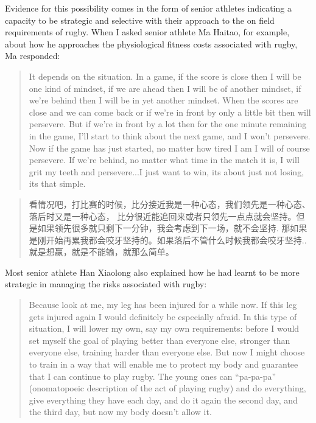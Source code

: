 \begin{CJK}{UTF8}{gbsn}
Evidence for this possibility comes in the form of senior athletes indicating a capacity to be strategic and selective with their approach to the on field requirements of rugby.  When I asked senior athlete Ma Haitao, for example, about how he approaches the physiological fitness costs associated with rugby, Ma responded:

    \begin{quotation}
      It depends on the situation.  In a game, if the score is close then I will be one kind of mindset, if we are ahead then I will be of another mindset, if we're behind then I will be in yet another mindset.  When the scores are close and we can come back or if we're in front by only a little bit then will persevere.  But if we're in front by a lot then for the one minute remaining in the game, I'll start to think about the next game, and I won't persevere.  Now if the game has just started, no matter how tired I am I will of course persevere. If we're behind, no matter what time in the match it is, I will grit my teeth and persevere...I just want to win, its about just not losing, its that simple.
    \end{quotation}

    \begin{quotation}
      看情况吧，打比赛的时候，比分接近我是一种心态，我们领先是一种心态、落后时又是一种心态， 比分很近能追回来或者只领先一点点就会坚持。但是如果领先很多就只剩下一分钟，我会考虑到下一场，就不会坚持.  那如果是刚开始再累我都会咬牙坚持的。如果落后不管什么时候我都会咬牙坚持..就是想赢，就是不能输，就那么简单。
    \end{quotation}

Most senior athlete Han Xiaolong also explained how he had learnt to be more strategic in managing the risks associated with rugby:

    \begin{quotation}
      Because look at me, my leg has been injured for a while now.  If this leg gets injured again I would definitely be especially afraid.  In this type of situation, I will lower my own, say my own requirements: before I would set myself the goal of playing better than everyone else, stronger than everyone else, training harder than everyone else.  But now I might choose to train in a way that will enable me to protect my body and guarantee that I can continue to play rugby.  The young ones can ``pa-pa-pa'' (onomatopoeic description of the act of playing rugby) and do everything, give everything they have each day, and do it again the second day, and the third day, but now my body doesn't allow it.
    \end{quotation}


\end{CJK}
